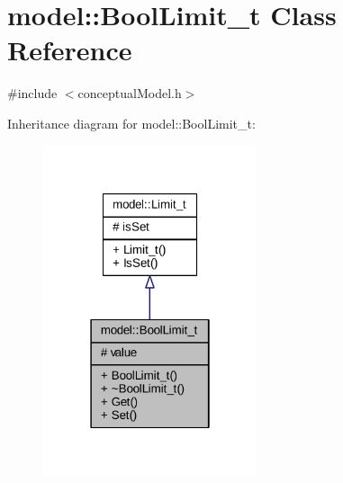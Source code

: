 \hypertarget{classmodel_1_1_bool_limit__t}{}\section{model\+:\+:Bool\+Limit\+\_\+t Class Reference}
\label{classmodel_1_1_bool_limit__t}


{\ttfamily \#include $<$conceptual\+Model.\+h$>$}



Inheritance diagram for model\+:\+:Bool\+Limit\+\_\+t\+:
\nopagebreak
\begin{figure}[H]
\begin{center}
\leavevmode
\includegraphics[width=178pt]{classmodel_1_1_bool_limit__t__inherit__graph}
\end{center}
\end{figure}


